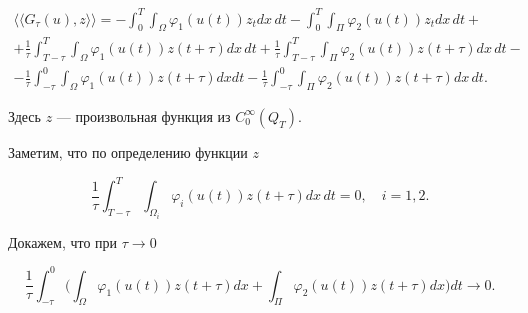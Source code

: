 \begin{pf}
\begin{multline} 


\label{eq14.5}


\langle \langle G_{\tau} (u), z \rangle \rangle=-


\int_{0}^{T} \int_{\Omega} \varphi_{1}(u(t)) z_{t} dx\,dt-


\int_{0}^{T} \int_{\Pi} \varphi_{2}(u(t)) z_{t} dx\,dt+ \\


%


+\frac{1}{\tau} \int_{T-\tau}^{T}


\int_{\Omega} \varphi_{1}(u(t))z(t+\tau) dx\, dt+


\frac{1}{\tau} \int_{T-\tau}^{T}


\int_{\Pi} \varphi_{2}(u(t))z(t+\tau) dx\, dt-\\


%


- \frac{1}{\tau} \int_{- \tau}^{0}


\int_{\Omega} \varphi_{1}(u(t))z(t+\tau) dx dt-


\frac{1}{\tau} \int_{- \tau}^{0}


\int_{\Pi} \varphi_{2}(u(t))z(t+\tau) dx\, dt.


\end{multline} 


Здесь $z$ --- произвольная функция из $C_{0}^{\infty}(Q_T)$.


Заметим, что по определению функции $z$


\begin{equation}


\frac{1}{\tau} \int_{T-\tau}^{T}


\int_{\Omega_{i}} \varphi_{i}(u(t))z(t+\tau) dx\, dt=0,


\quad i=1,2.


\label{eq14.6}


\end{equation}


Докажем, что при $\tau \to 0$


\begin{equation}


\frac{1}{\tau} \int_{- \tau}^{0} \bigg (


\int_{\Omega} \varphi_{1}(u(t)) z(t+\tau) dx+


\int_{\Pi} \varphi_{2}(u(t)) z(t+\tau) dx \bigg) dt 


\longrightarrow 0.


\label{eq14.7}



\end{equation}
\end{pf}
